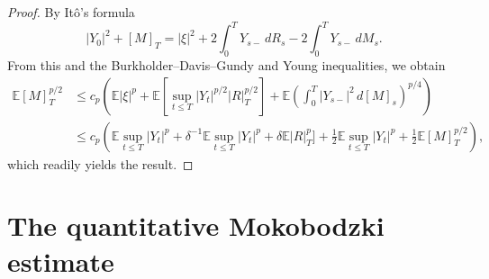 \documentclass[11pt,a4paper,reqno]{amsart}
\theoremstyle{definition}
\numberwithin{equation}{section}
\begin{document}
\begin{proof}
By  It\^o's formula 
\[
|Y_0|^2+[M]_T=|\xi|^2+2\int_0^TY_{s-}\,dR_s-2\int_0^TY_{s-}\,dM_s.
\]
From this and  the Burkholder--Davis--Gundy  and Young inequalities, we obtain
\[
\begin{split}
\mathbb E[M]^{p/2}_T&\le c_p\left(\mathbb E|\xi|^p
+\mathbb E[\sup_{t\le T}|Y_t|^{p/2}|R|_T^{p/2}]
+\mathbb E\left(\int_0^T |Y_{s-}|^{2}\,d[M]_s\right)^{p/4}\right)\\&
\le c_p\left(\mathbb E\sup_{t\le T}|Y_t|^p+\delta^{-1}\mathbb E\sup_{t\le T}|Y_t|^{p}
+\delta\mathbb E|R|_T^{p}]
+\frac12\mathbb E\sup_{t\le T} |Y_{t}|^{p}+\frac12\mathbb E[M]^{p/2}_T\right),
\end{split}
\]
which readily yields the result.
\end{proof}



\section{The quantitative Mokobodzki estimate}\label{sec.main.var}
\end{document}
